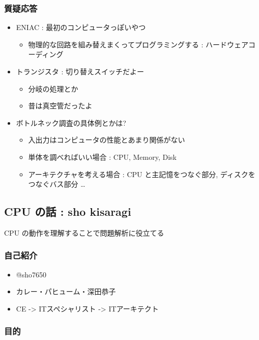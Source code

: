 \documentclass{jsarticle}
\begin{document}
\subsubsection{質疑応答}

\begin{itemize}
\item
  ENIAC : 最初のコンピュータっぽいやつ
  \begin{itemize}
  \item
    物理的な回路を組み替えまくってプログラミングする :
    ハードウェアコーディング
  \end{itemize}
\item
  トランジスタ : 切り替えスイッチだよー
  \begin{itemize}
  \item
    分岐の処理とか
  \item
    昔は真空管だったよ
  \end{itemize}
\item
  ボトルネック調査の具体例とかは?
  \begin{itemize}
  \item
    入出力はコンピュータの性能とあまり関係がない
  \item
    単体を調べればいい場合 : CPU, Memory, Disk
  \item
    アーキテクチャを考える場合 : CPU と主記憶をつなぐ部分,
    ディスクをつなぐバス部分 \ldots{}
  \end{itemize}
\end{itemize}
\subsection{CPU の話 : sho kisaragi}

CPU の動作を理解することで問題解析に役立てる

\subsubsection{自己紹介}

\begin{itemize}
\item
  @sho7650
\item
  カレー・パヒューム・深田恭子
\item
  CE -\textgreater{} ITスペシャリスト -\textgreater{} ITアーキテクト
\end{itemize}
\subsubsection{目的}
\end{document}
